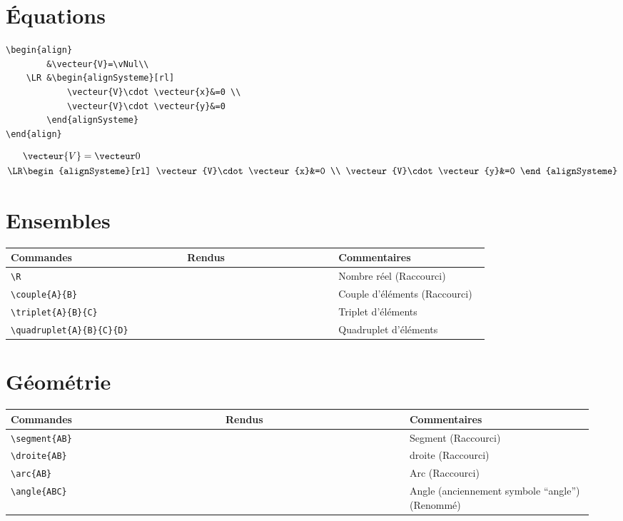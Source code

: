 \documentclass[a4paper,10pt]{article}
\newcommand{\rac}{({\color{red}Raccourci})}
\newcommand{\ren}{({\color{blue}Renommé})}
\begin{document}
	\section{Équations}
		
			\noindent
			\begin{verbatim}
\begin{align}
		&\vecteur{V}=\vNul\\
	\LR	&\begin{alignSysteme}[rl]
			\vecteur{V}\cdot \vecteur{x}&=0	\\
			\vecteur{V}\cdot \vecteur{y}&=0
	   	\end{alignSysteme}
\end{align}
			\end{verbatim}
			
\begin{align}
		&\vecteur{V}=\vNul\\
	\LR	&\begin{alignSysteme}[rl]
			\vecteur{V}\cdot \vecteur{x}&=0	\\
			\vecteur{V}\cdot \vecteur{y}&=0
	   	\end{alignSysteme}
\end{align}
	\section{Ensembles}

	\noindent
	\begin{tabular}{|p{0.35\linewidth}|p{0.3\linewidth}|p{0.3\linewidth}|}
		\hline
			\textbf{Commandes}&\textbf{Rendus}&\textbf{Commentaires}
		\\\hline\hline
			\verb!\R!	&	\R		&	Nombre réel \rac
		\\\hline
			\verb!\couple{A}{B}!	&	\couple{A}{B}		&	Couple d'éléments \rac
		\\\hline
			\verb!\triplet{A}{B}{C}!	&	\triplet{A}{B}{C}			&	Triplet d'éléments
		\\\hline
			\verb!\quadruplet{A}{B}{C}{D}!		&	\quadruplet{A}{B}{C}{D}			&	Quadruplet d'éléments
		\\\hline
	\end{tabular}



	\section{Géométrie}

	\noindent
	\begin{tabular}{|p{0.35\linewidth}|p{0.3\linewidth}|p{0.3\linewidth}|}
		\hline
			\textbf{Commandes}&\textbf{Rendus}&\textbf{Commentaires}
		\\\hline\hline
			\verb!\segment{AB}!	&	\segment{AB}		&	Segment \rac
		\\\hline
			\verb!\droite{AB}!	&	\droite{AB}		&	droite \rac
		\\\hline
			\verb!\arc{AB}!		&	\arc{AB}			&	Arc \rac
		\\\hline
			\verb!\angle{ABC}!		&	\angle{ABC}		&	Angle (anciennement symbole ``angle'') \ren
		\\\hline
	\end{tabular}
\end{document}
